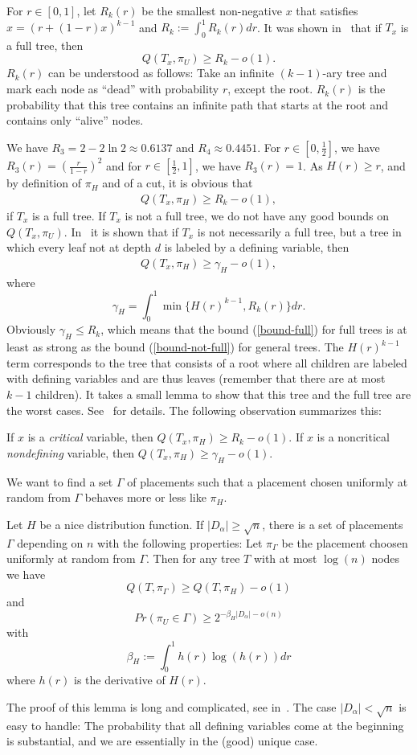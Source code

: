 For $r\in[0,1]$, let $R_k(r)$ be the smallest non-negative $x$ that
satisfies $x=(r+(1-r)x)^{k-1}$ and $R_k:=\int_0^1 R_k(r)dr$. It was
shown in~\cite{ppsz} that if $T_x$ is a full tree, then
\[Q(T_x,\pi_U)\geq R_k-o(1).\]
$R_k(r)$ can be understood as follows: Take an infinite $(k-1)$-ary tree and mark each node as ``dead'' with probability $r$, except the root. $R_k(r)$ is the probability that this tree contains an infinite path that starts at the root and contains only ``alive'' nodes.

We have $R_3=2-2\ln 2\approx0.6137$ and $R_4\approx 0.4451$. For $r\in[0,\frac{1}{2}]$, we have $R_3(r)=\left(\frac{r}{1-r}\right)^2$ and for $r\in[\frac{1}{2},1]$, we have $R_3(r)=1$. 
As $H(r)\geq r$, and by definition of $\pi_H$ and of a cut, it is obvious that
\begin{eqnarray}
  Q(T_x,\pi_H)\geq R_k-o(1), 
  \label{bound-full}
\end{eqnarray}
 if $T_x$ is a full tree.  If $T_x$
is not a full tree, we do not have any good bounds on $Q(T_x, \pi_U)$.
In~\cite{rolf2006} it is shown that if $T_x$ is not necessarily a full
tree, but a tree in which every leaf not at depth $d$ is labeled by a
defining variable, then
\begin{eqnarray}
  Q(T_x,\pi_H)\geq \gamma_H-o(1),
  \label{bound-not-full}
\end{eqnarray}
where
\[\gamma_H=\int_0^1 \min\{H(r)^{k-1},R_k(r)\}dr.\]
Obviously $\gamma_H\leq R_k$, which means that the bound
(\ref{bound-full}) for full trees is at least as strong as the bound
(\ref{bound-not-full}) for general trees. The $H(r)^{k-1}$ term
corresponds to the tree that consists of a root where all
children are labeled with defining variables and are thus leaves
(remember that there are at most $k-1$ children).  It takes a small
lemma to show that this tree and the full tree are the worst cases.
See~\cite{thesis} for details.  The following observation summarizes
this:
\begin{observation}
\label{p.o.trees}
If $x$ is a \emph{critical} variable, then $Q(T_x,\pi_H)\geq
R_k-o(1).$ If $x$ is a noncritical \emph{nondefining} variable, then
$Q(T_x,\pi_H)\geq \gamma_H-o(1).$
\end{observation}
We want to find a set $\Gamma$ of placements such that a placement
chosen uniformly at random from $\Gamma$ behaves more or less like
$\pi_H$.
\begin{lemma}
\label{p.l.Hlemma}
Let $H$ be a nice distribution function. If $|D_\alpha|\geq\sqrt{n}$,
there is a set of placements $\Gamma$ depending on $n$ with the
following properties: Let $\pi_\Gamma$ be the placement choosen
uniformly at random from $\Gamma$. Then for any tree $T$ with at most
$\log(n)$ nodes we have
\[Q(T,\pi_\Gamma)\geq Q(T,\pi_H)-o(1)\]
and
\[Pr(\pi_U\in\Gamma)\geq 2^{-\beta_H |D_\alpha|-o(n)}\]
with
\[\beta_H:=\int_0^1 h(r)\log\left(h(r)\right)dr\]
where $h(r)$ is the derivative of $H(r)$.
\end{lemma}
The proof of this lemma is long and complicated, see 
in~\cite{thesis}. The case $|D_\alpha|<\sqrt{n}$ is easy to handle:
The probability that all defining variables come at the beginning is substantial, and we are essentially in the
(good) unique case.  

